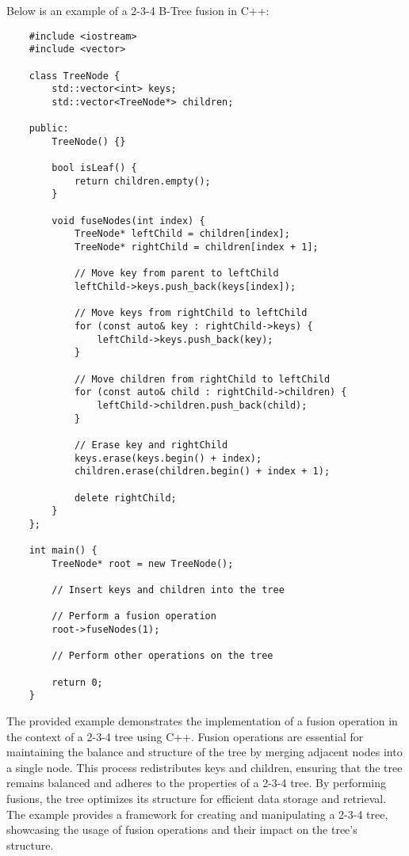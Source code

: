 \begin{solution}
    Below is an example of a 2-3-4 B-Tree fusion in C++:

    \horizontalline

    \begin{verbatim}
    #include <iostream>
    #include <vector>
    
    class TreeNode {
        std::vector<int> keys;
        std::vector<TreeNode*> children;
    
    public:
        TreeNode() {}
    
        bool isLeaf() {
            return children.empty();
        }
    
        void fuseNodes(int index) {
            TreeNode* leftChild = children[index];
            TreeNode* rightChild = children[index + 1];
    
            // Move key from parent to leftChild
            leftChild->keys.push_back(keys[index]);
    
            // Move keys from rightChild to leftChild
            for (const auto& key : rightChild->keys) {
                leftChild->keys.push_back(key);
            }
    
            // Move children from rightChild to leftChild
            for (const auto& child : rightChild->children) {
                leftChild->children.push_back(child);
            }
    
            // Erase key and rightChild
            keys.erase(keys.begin() + index);
            children.erase(children.begin() + index + 1);
    
            delete rightChild;
        }
    };
    
    int main() {
        TreeNode* root = new TreeNode();
    
        // Insert keys and children into the tree
    
        // Perform a fusion operation
        root->fuseNodes(1);
    
        // Perform other operations on the tree
    
        return 0;
    }        
    \end{verbatim}

    \horizontalline

    The provided example demonstrates the implementation of a fusion operation in the context of a 2-3-4 tree using C++. Fusion operations are essential for maintaining the balance and structure of the tree by merging adjacent nodes into a single node. This process redistributes keys and children, ensuring that the tree remains 
    balanced and adheres to the properties of a 2-3-4 tree. By performing fusions, the tree optimizes its structure for efficient data storage and retrieval. The example provides a framework for creating and manipulating a 2-3-4 tree, showcasing the usage of fusion operations and their impact on the tree's structure.
\end{solution}

